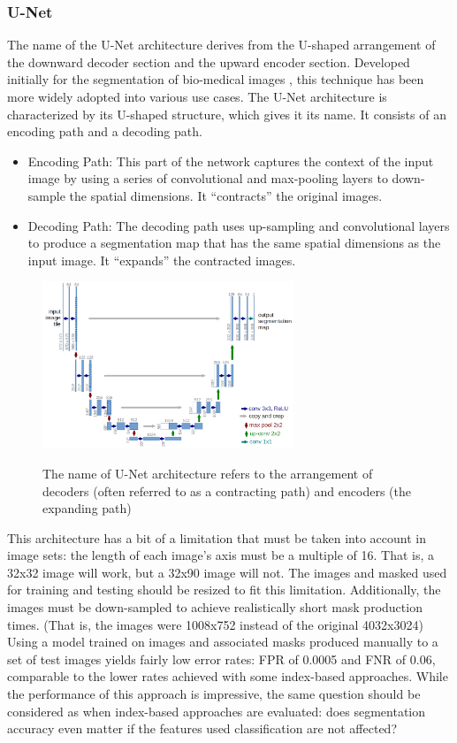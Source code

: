 \documentclass[letterpaper]{report}
\begin{document}
{\subsubsection{U-Net}
The name of the U-Net architecture derives from the U-shaped arrangement of the downward decoder section and the upward encoder section. Developed initially for the segmentation of bio-medical images \parencite{Ronneberger2015-ye}, this technique has been more widely adopted into various use cases. The U-Net architecture is characterized by its U-shaped structure, which gives it its name. It consists of an encoding path and a decoding path.
\begin{itemize}
	\item{Encoding Path: This part of the network captures the context of the input image by using a series of convolutional and max-pooling layers to down-sample the spatial dimensions. It “contracts” the original images.}
	\item{Decoding Path: The decoding path uses up-sampling and convolutional layers to produce a segmentation map that has the same spatial dimensions as the input image. It “expands” the contracted images.}
\end{itemize}

\begin{figure}[H]
	\centering
	\includegraphics[height=5cm]{figures/u-net-architecture.png}
	\label{fig:u-net}
	\caption[U-Net architecture]{The name of U-Net architecture refers to the arrangement of decoders (often referred to as a contracting path) and encoders (the expanding path)}
\end{figure}
This architecture has a bit of a limitation that must be taken into account in image sets: the length of each image's axis must be a multiple of 16. That is, a 32x32 image will work, but a 32x90 image will not. The images and masked used for training and testing should be resized to fit this limitation. Additionally, the images must be down-sampled to achieve realistically short mask production times. (That is, the images were 1008x752 instead of the original 4032x3024) Using a model trained on images and associated masks produced manually to a set of test images yields fairly low error rates: \gls{FPR} of 0.0005 and \gls{FNR} of 0.06, comparable to the lower rates achieved with some index-based approaches. While the performance of this approach is impressive, the same question should be considered as when index-based approaches are evaluated: does segmentation accuracy even matter if the features used classification are not affected?

}
\end{document}
